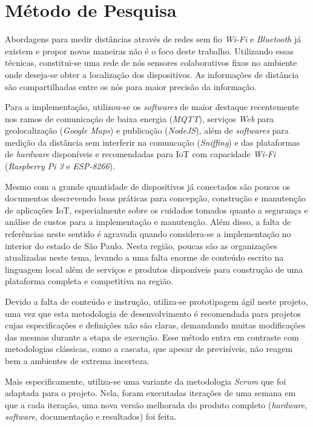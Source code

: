 
\chapter{Método de Pesquisa}
\label{chap:Método de Pesquisa}

Abordagens para medir distâncias através de redes sem fio \emph{Wi-Fi}
\cite{bahillo2009ieee} e \emph{Bluetooth} já existem e propor novas maneiras
não é o foco deste trabalho. Utilizando essas técnicas, constitui-se uma
rede de nós sensores colaborativos fixos no ambiente onde deseja-se obter a
localização dos dispositivos. As informações de distância são compartilhadas
entre os nós para maior precisão da informação.

Para a implementação, utilizou-se os \emph{softwares} de maior
destaque recentemente nos ramos de comunicação de baixa energia (\emph{MQTT}),
serviços \emph{Web} para geolocalização (\emph{Google Maps}) e publicação
(\emph{NodeJS}), além de \emph{softwares} para medição da distância sem
interferir na comuncação (\emph{Sniffing}) e das plataformas de
\emph{hardware} disponíveis e recomendadas para IoT com capacidade
\emph{Wi-Fi} (\emph{Raspberry Pi 3} e \emph{ESP-8266}).

Mesmo com a grande quantidade de dispositivos já conectados são poucos os
documentos descrevendo boas práticas para concepção, construção e manutenção de
aplicações IoT, especialmente sobre os cuidados tomados quanto a segurança e
análise de custos para a implementação e manutenção. Além
disso, a falta de referências neste sentido é agravada quando considera-se a
implementação no interior do estado de São Paulo. Nesta região, poucas são as
organizações atualizadas neste tema, levando a uma falta enorme de conteúdo
escrito na linguagem local além de serviços e produtos disponíveis para
construção de uma plataforma completa e competitiva na região.

Devido a falta de conteúdo e instrução, utiliza-se prototipagem ágil neste
projeto, uma vez que esta metodologia de desenvolvimento é recomendada para
projetos cujas especificações e definições não são claras, demandando muitas
modificações das mesmas durante a etapa de execução. Esse método entra em
contraste com metodologias clássicas, como a cascata, que apesar de previsíveis,
não reagem bem a ambientes de extrema incerteza.

Mais especificamente, utiliza-se uma variante da metodologia \emph{Scrum}
\cite{James2016} que foi adaptada para o projeto. Nela, foram executadas
iterações de uma semana em que a cada iteração, uma nova versão melhorada do
produto completo (\emph{hardware}, \emph{software}, documentação e
resultados) foi feita.

